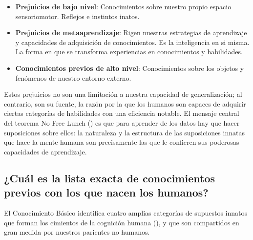 \begin{itemize}
    \item \textbf{Prejuicios de bajo nivel}: Conocimientos sobre nuestro propio espacio sensoriomotor. Reflejos e instintos inatos.
    \item \textbf{Prejuicios de metaaprendizaje}: Rigen nuestras estrategias de aprendizaje y capacidades de adquisición de conocimientos. Es la inteligencia en si misma. La forma en que se transforma experiencias en conocimientos y habilidades.
    \item \textbf{Conocimientos previos de alto nivel}: Conocimientos sobre los objetos y fenómenos de nuestro entorno externo.
\end{itemize}

Estos prejuicios no son una limitación a nuestra capacidad de generalización; al contrario, son su fuente, la razón por la que los humanos son capaces de adquirir ciertas categorías de habilidades con una eficiencia notable. El mensaje central del teorema No Free Lunch (\cite{wolpert1997no}) es que para aprender de los datos hay que hacer suposiciones sobre ellos: la naturaleza y la estructura de las suposiciones innatas que hace la mente humana son precisamente las que le confieren sus poderosas capacidades de aprendizaje. 

\subsection{¿Cuál es la lista exacta de conocimientos previos con los que nacen los humanos?}

El Conocimiento Básico identifica cuatro amplias categorías de supuestos innatos que forman los cimientos de la cognición humana  (\cite{spelke2007core}), y que son compartidos en gran medida por nuestros parientes no humanos.

